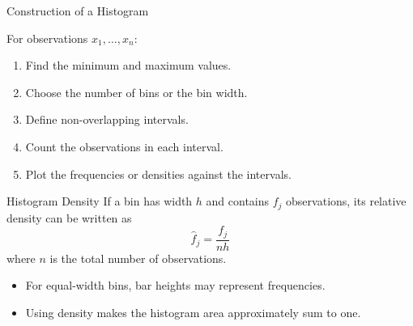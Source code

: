 \documentclass{beamer}
\begin{document}
\begin{frame}{Construction of a Histogram}

For observations $x_1,\ldots,x_n$:

\begin{enumerate}
    \item Find the minimum and maximum values.
    \item Choose the number of bins or the bin width.
    \item Define non-overlapping intervals.
    \item Count the observations in each interval.
    \item Plot the frequencies or densities against the intervals.
\end{enumerate}

\vspace{0.1cm}

\begin{block}{Histogram Density}
If a bin has width $h$ and contains $f_j$ observations,
its relative density can be written as
\[
\boxed{
\hat{f}_j = \frac{f_j}{nh}
}
\]
where $n$ is the total number of observations.
\end{block}

\vspace{0.1cm}

\begin{itemize}
    \item For equal-width bins, bar heights may represent frequencies.
    \item Using density makes the histogram area approximately sum to one.
\end{itemize}

\end{frame}

\end{document}
